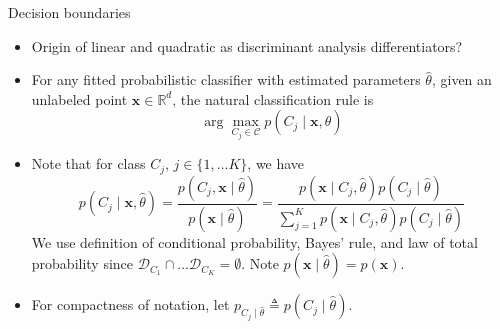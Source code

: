 \documentclass{beamer}
\numberwithin{equation}{section}
\begin{document}
\begin{frame}{Decision boundaries}
    \begin{itemize}
        \item
        Origin of linear and quadratic as discriminant analysis
        differentiators?

        \item
        For any fitted probabilistic classifier with estimated parameters
        $ \hat{\theta} $, given an unlabeled point $ \mathbf{x} \in
        \mathbb{R}^d $, the natural classification rule is
        \begin{equation} \label{class_rule}
            \arg\max_{C_j \in \mathcal{C}}p(C_j \mid \mathbf{x}, \hat{\theta})
        \end{equation}

        \item
        Note that for class $ C_j $, $ j \in \{1, \ldots K\} $, we have
        \begin{equation}
            p(C_j \mid \mathbf{x}, \hat{\theta}) =
            \frac{p(C_j, \mathbf{x} \mid \hat{\theta})}{
                p(\mathbf{x} \mid \hat{\theta})
            } = \frac{
                p(\mathbf{x} \mid C_j, \hat{\theta})p(C_j \mid \hat{\theta})
            }{
                \sum_{j = 1}^Kp(\mathbf{x} \mid C_j, \hat{\theta})
                p(C_j \mid \hat{\theta})
            }
        \end{equation}
        We use definition of conditional probability, Bayes' rule, and law of
        total probability since $ \mathcal{D}_{C_1} \cap \ldots
        \mathcal{D}_{C_K} = \emptyset $. Note
        $ p(\mathbf{x} \mid \hat{\theta}) = p(\mathbf{x}) $.

        \item
        For compactness of notation, let
        $ p_{C_j \mid \hat{\theta}} \triangleq p(C_j \mid \hat{\theta}) $.
    \end{itemize}
\end{frame}
\end{document}
